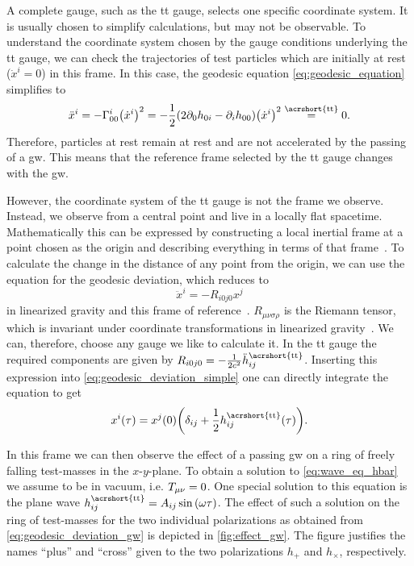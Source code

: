 A complete gauge, such as the \acrshort{tt} gauge, selects one specific coordinate system. It is usually chosen to simplify calculations, but may not be observable. To understand the coordinate system chosen by the gauge conditions underlying the \acrshort{tt} gauge, we can check the trajectories of test particles which are initially at rest ($\dot{x}^i=0$) in this frame. In this case, the geodesic equation \eqref{eq:geodesic_equation} simplifies to~\cite{Maggiore:2008aaa}%
\begin{equation}
\ddot{x}^i = -\Gamma^i_{00}\lr{\dot{x}^i}^2=-\frac{1}{2}\lr{2\partial_0 h_{0i}-\partial_i h_{00}}\lr{\dot{x}^i}^2 \overset{\text{\acrshort{tt}}}{=} 0.
\end{equation}
Therefore, particles at rest remain at rest and are not accelerated by the passing of a \acrshort{gw}. This means that the reference frame selected by the \acrshort{tt} gauge changes with the \acrshort{gw}.

However, the coordinate system of the \acrshort{tt} gauge is not the frame we observe. Instead, we observe from a central point and live in a locally flat spacetime. Mathematically this can be expressed by constructing a local inertial frame at a point chosen as the origin and describing everything in terms of that frame~\cite{Maggiore:2008aaa}. %
To calculate the change in the distance of any point from the origin, we can use the equation for the geodesic deviation, which reduces to
\begin{equation}\label{eq:geodesic_deviation_simple}
\ddot{x}^i = -R_{i 0 j 0} x^j
\end{equation}
in linearized gravity and this frame of reference~\cite{Misner:1973aaa}. %
$R_{\mu\nu\sigma\rho}$ is the Riemann tensor, which is invariant under coordinate transformations in linearized gravity~\cite{Maggiore:2008aaa}. %
We can, therefore, choose any gauge we like to calculate it. In the \acrshort{tt} gauge the required components are given by $R_{i0j0} = -\frac{1}{2c^2}\ddot{h}^{\text{\acrshort{tt}}}_{ij}$. Inserting this expression into \eqref{eq:geodesic_deviation_simple} one can directly integrate the equation to get~\cite{Misner:1973aaa}%
\begin{equation}\label{eq:geodesic_deviation_gw}
x^i\lr{\tau} = x^j\lr{0}\lr{\delta_{ij} + \frac{1}{2}h^{\text{\acrshort{tt}}}_{ij}\lr{\tau}}.
\end{equation}

In this frame we can then observe the effect of a passing \acrshort{gw} on a ring of freely falling test-masses in the $x$-$y$-plane. To obtain a solution to \eqref{eq:wave_eq_hbar} we assume to be in vacuum, i.e. $T_{\mu\nu}=0$. One special solution to this equation is the plane wave $h^{\text{\acrshort{tt}}}_{ij} = A_{ij}\sin\lr{\omega\tau}$. The effect of such a solution on the ring of test-masses for the two individual polarizations as obtained from \eqref{eq:geodesic_deviation_gw} is depicted in \autoref{fig:effect_gw}. The figure justifies the names ``plus'' and ``cross'' given to the two polarizations $h_+$ and $h_\times$, respectively.

